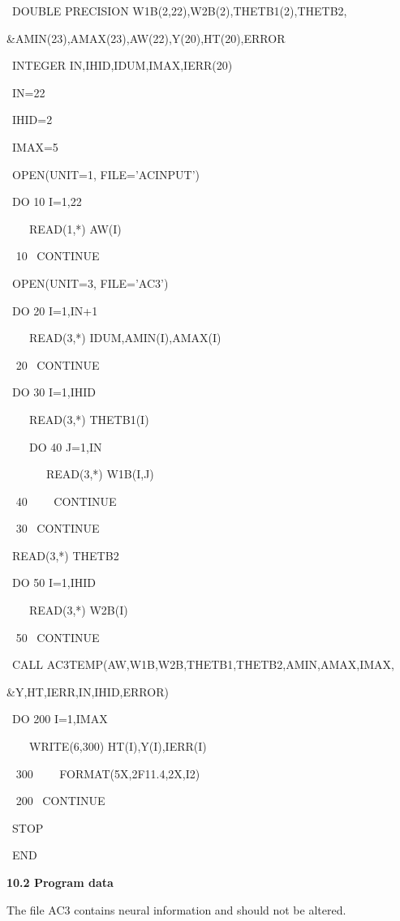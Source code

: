 \item {}       ~DOUBLE PRECISION W1B(2,22),W2B(2),THETB1(2),THETB2,
\item {}    \&AMIN(23),AMAX(23),AW(22),Y(20),HT(20),ERROR
\item {}       ~INTEGER IN,IHID,IDUM,IMAX,IERR(20)
\item {}        ~IN=22
\item {}        ~IHID=2
\item {}        ~IMAX=5
\item {}        ~OPEN(UNIT=1, FILE='ACINPUT')
\item {}        ~DO 10 I=1,22
\item {}        ~~~~READ(1,*) AW(I)
\item {~ 10}    ~CONTINUE
\item {}       ~OPEN(UNIT=3, FILE='AC3')
\item {}       ~DO 20 I=1,IN+1
\item {}       ~~~~READ(3,*) IDUM,AMIN(I),AMAX(I)
\item {~ 20}   ~CONTINUE
\item {}        ~DO 30 I=1,IHID
\item {}        ~~~~READ(3,*) THETB1(I)
\item {}        ~~~~DO 40 J=1,IN
\item {}        ~~~~~~~READ(3,*) W1B(I,J)
\item {~ 40}   ~~~~CONTINUE
\item {~ 30}   ~CONTINUE
\item {}        ~READ(3,*) THETB2
\item {}        ~DO 50 I=1,IHID
\item {}        ~~~~READ(3,*) W2B(I)
\item {~ 50}   ~CONTINUE
\item {}        ~CALL AC3TEMP(AW,W1B,W2B,THETB1,THETB2,AMIN,AMAX,IMAX,
\item {}       \&Y,HT,IERR,IN,IHID,ERROR)
\item {}        ~DO 200 I=1,IMAX
\item {}        ~~~~WRITE(6,300) HT(I),Y(I),IERR(I)
\item {~ 300}   ~~~~FORMAT(5X,2F11.4,2X,I2)
\item {~ 200}   ~CONTINUE
\item {}        ~STOP
\item {}        ~END
\vfill \eject
\item {} {\bf 10.2 Program data}
\bigskip
\item {} The file AC3 contains neural information and should not be altered.
